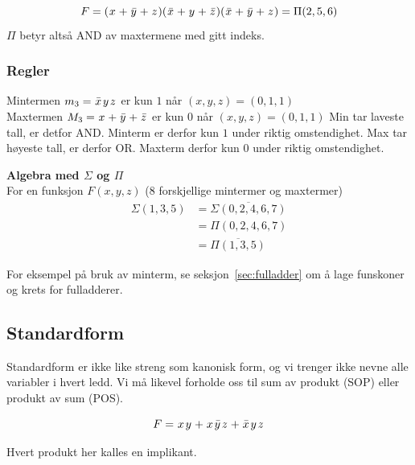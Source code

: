 \documentclass[12pt,a4paper,norsk]{article}
\begin{document}
\[F = (\hspace{0.06em} x\hspace{0.06em}+\hspace{0.06em}\bar{y}\hspace{0.06em}+\hspace{0.06em} z\hspace{0.06em})(\hspace{0.06em}\bar{x}\hspace{0.06em}+\hspace{0.06em} y\hspace{0.06em}+\hspace{0.06em}\bar{z}\hspace{0.06em})(\hspace{0.06em}\bar{x}\hspace{0.06em}+\hspace{0.06em}\bar{y}\hspace{0.06em}+\hspace{0.06em} z\hspace{0.06em}) = \Pi(2,5,6)\]
$\Pi$ betyr altså AND av maxtermene med gitt indeks.

\subsubsection{Regler}
Mintermen $m_{3} = \kom{x}\var{y}\var{z}$ er kun $1$ når $(x,y,z) = (0,1,1)$ \\
Maxtermen $M_{3} = \hspace{0.06em} x\hspace{0.06em}+\hspace{0.06em}\bar{y}\hspace{0.06em}+\hspace{0.06em}\bar{z}\hspace{0.06em}$ er kun $0$ når $(x,y,z) = (0,1,1)$
%
Min tar laveste tall, er detfor AND\@. Minterm er derfor kun $1$ under riktig
omstendighet. Max tar høyeste tall, er derfor OR\@. Maxterm derfor kun $0$ under
riktig omstendighet.

\textbf{Algebra med $\Sigma$ og $\Pi$}\\
For en funksjon $F(x,y,z)$ (8 forskjellige mintermer og maxtermer)
\begin{align*}
  \Sigma(1,3,5) &= \overline{\Sigma(0,2,4,6,7)} \\
           &= \Pi(0,2,4,6,7) \\
           &= \overline{\Pi(1,3,5)}
\end{align*}

For eksempel på bruk av minterm, se seksjon~\ref{sec:fulladder} om å lage
funskoner og krets for fulladderer.

\subsection{Standardform}
Standardform er ikke like streng som kanonisk form, og vi trenger ikke nevne alle
variabler i hvert ledd. Vi må likevel forholde oss til sum av produkt (SOP)
eller produkt av sum (POS).

\[F = \var{x}\var{y} + \var{x}\kom{y}\var{z} + \kom{x}\var{y}\var{z}\]

Hvert produkt her kalles en implikant.
\end{document}
